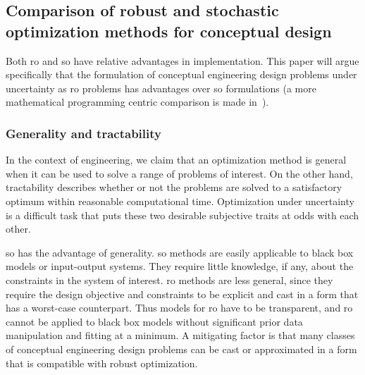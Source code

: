 \subsection{Comparison of robust and stochastic optimization methods for conceptual design}
\label{sec:robustvsstochastic}

Both \gls{ro} and \gls{so} have relative advantages in implementation. This paper will
argue specifically that the formulation of conceptual engineering design problems under uncertainty as
\gls{ro} problems has advantages over \gls{so} formulations (a more
mathematical programming centric comparison is made in~\cite{Bertsimas2011}).

\subsubsection{Generality and tractability}

In the context of engineering, we claim that an optimization method is general
when it can be used to solve a range of problems of interest. On the other hand,
tractability describes whether or not the problems are solved to a satisfactory
optimum within reasonable computational time. Optimization
under uncertainty is a difficult task that puts these two desirable subjective traits
at odds with each other.

\gls{so} has the advantage of generality.
\gls{so} methods are easily applicable to black box models or input-output systems.
They require little knowledge, if any, about the constraints in the system of interest.
\gls{ro} methods are less general, since they require
the design objective and constraints to be explicit and cast in a form that has a worst-case
counterpart. Thus models for \gls{ro} have to be transparent,
and \gls{ro} cannot be applied to black box models without significant prior data
manipulation and fitting at a minimum. A mitigating factor is that
many classes of conceptual engineering design problems can be cast or approximated in a form that
is compatible with robust optimization.

